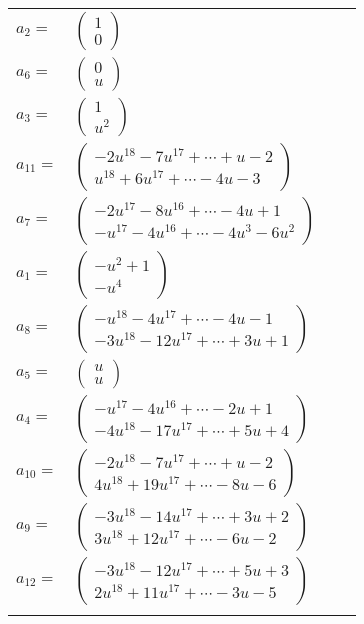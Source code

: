 \documentclass[1p]{elsarticle_modified}
\theoremstyle{definition}
\begin{document}
\begin{tabular}{m{7pt} m{180pt} m{7pt} m{180pt} }
\flushright $a_{2}=$&$\begin{pmatrix}1\\0\end{pmatrix}$ \\
\flushright $a_{6}=$&$\begin{pmatrix}0\\u\end{pmatrix}$ \\
\flushright $a_{3}=$&$\begin{pmatrix}1\\u^2\end{pmatrix}$ \\
\flushright $a_{11}=$&$\begin{pmatrix}-2 u^{18}-7 u^{17}+\cdots+u-2\\u^{18}+6 u^{17}+\cdots-4 u-3\end{pmatrix}$ \\
\flushright $a_{7}=$&$\begin{pmatrix}-2 u^{17}-8 u^{16}+\cdots-4 u+1\\- u^{17}-4 u^{16}+\cdots-4 u^3-6 u^2\end{pmatrix}$ \\
\flushright $a_{1}=$&$\begin{pmatrix}- u^2+1\\- u^4\end{pmatrix}$ \\
\flushright $a_{8}=$&$\begin{pmatrix}- u^{18}-4 u^{17}+\cdots-4 u-1\\-3 u^{18}-12 u^{17}+\cdots+3 u+1\end{pmatrix}$ \\
\flushright $a_{5}=$&$\begin{pmatrix}u\\u\end{pmatrix}$ \\
\flushright $a_{4}=$&$\begin{pmatrix}- u^{17}-4 u^{16}+\cdots-2 u+1\\-4 u^{18}-17 u^{17}+\cdots+5 u+4\end{pmatrix}$ \\
\flushright $a_{10}=$&$\begin{pmatrix}-2 u^{18}-7 u^{17}+\cdots+u-2\\4 u^{18}+19 u^{17}+\cdots-8 u-6\end{pmatrix}$ \\
\flushright $a_{9}=$&$\begin{pmatrix}-3 u^{18}-14 u^{17}+\cdots+3 u+2\\3 u^{18}+12 u^{17}+\cdots-6 u-2\end{pmatrix}$ \\
\flushright $a_{12}=$&$\begin{pmatrix}-3 u^{18}-12 u^{17}+\cdots+5 u+3\\2 u^{18}+11 u^{17}+\cdots-3 u-5\end{pmatrix}$\\&\end{tabular}
\end{document}
